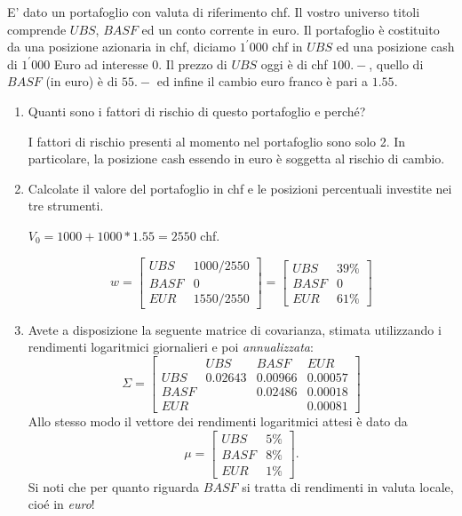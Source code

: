 \documentclass[a4paper,12pt]{article}
\begin{document}

\bigskip

E' dato un portafoglio con valuta di riferimento chf. Il vostro universo
titoli comprende $UBS$, $BASF$ ed un conto corrente in euro. Il portafoglio
\`{e} costituito da una posizione azionaria in chf, diciamo $1^{\prime }000$
chf in $UBS$ ed una posizione cash di $1^{\prime }000$ Euro ad interesse 0.
Il prezzo di $UBS$ oggi \`{e} di chf $100.-$, quello di $BASF$ (in euro)
\`{e} di $55.-$ ed infine il cambio euro franco \`{e} pari a $1.55$.

\begin{enumerate}
\item  Quanti sono i fattori di rischio di questo portafoglio e perch\'{e}?

I fattori di rischio presenti al momento nel portafoglio sono solo 2. In
particolare, la posizione cash essendo in euro \`{e} soggetta al rischio di
cambio.

\item  Calcolate il valore del portafoglio in chf e le posizioni percentuali
investite nei tre strumenti.

$V_{0}=1000+1000\ast 1.55=2550$ chf.

\[
w=\left[ 
\begin{array}{cc}
UBS & 1000/2550 \\ 
BASF & 0 \\ 
EUR & 1550/2550
\end{array}
\right] =\left[ 
\begin{array}{cc}
UBS & 39\% \\ 
BASF & 0 \\ 
EUR & 61\%
\end{array}
\right] 
\]

\item  Avete a disposizione la seguente matrice di covarianza, stimata
utilizzando i rendimenti logaritmici giornalieri e poi \emph{annualizzata}:
\[
\Sigma =\left[ 
\begin{array}{cccc}
& UBS & BASF & EUR \\ 
UBS & 0.02643 & 0.00966 & 0.00057 \\ 
BASF &  & 0.02486 & 0.00018 \\ 
EUR &  &  & 0.00081
\end{array}
\right] 
\]
Allo stesso modo il vettore dei rendimenti logaritmici attesi \`{e} dato da
\[
\mu =\left[ 
\begin{array}{cc}
UBS & 5\% \\ 
BASF & 8\% \\ 
EUR & 1\%
\end{array}
\right] .
\]
Si noti che per quanto riguarda $BASF$ si tratta di rendimenti in valuta
locale, cio\'{e} in \emph{euro}!


\end{enumerate}
\end{document}
